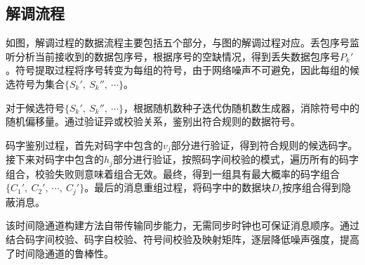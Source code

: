 \subsection{解调流程}
\label{chap:hash:designation:demodulation}


如图，解调过程的数据流程主要包括五个部分，与图的解调过程对应。丢包序号监听分析当前接收到的数据包序号，根据序号的空缺情况，得到丢失数据包序号$P_{k}'$。符号提取过程将序号转变为每组的符号，由于网络噪声不可避免，因此每组的候选符号为集合$\{S_{k}',\ S_{k}'',\ \cdots \}$。

对于候选符号$\{S_{k}',\ S_{k}'',\ \cdots \}$，根据随机数种子迭代伪随机数生成器，消除符号中的随机偏移量。通过验证异或校验关系，鉴别出符合规则的数据符号。

码字鉴别过程，首先对码字中包含的$v_{j}$部分进行验证，得到符合规则的候选码字。接下来对码字中包含的$h_{j}$部分进行验证，按照码字间校验的模式，遍历所有的码字组合，校验失败则意味着组合无效。最终，得到一组具有最大概率的码字组合$\{C_{1}',\ C_{2}',\ \cdots,\ C_{j}'\}$。最后的消息重组过程，将码字中的数据块$D_{i}$按序组合得到隐蔽消息。

该时间隐通道构建方法自带传输同步能力，无需同步时钟也可保证消息顺序。通过结合码字间校验、码字自校验、符号间校验及映射矩阵，逐层降低噪声强度，提高了时间隐通道的鲁棒性。